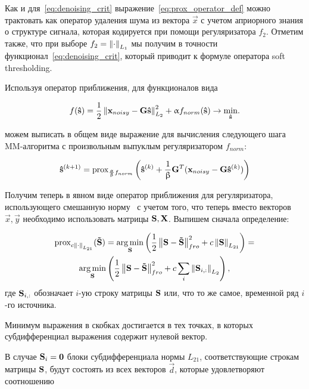 Как и для~\ref{eq:denoising_crit} выражение~\ref{eq:prox_operator_def} можно
трактовать как оператор удаления шума из вектора $\vec{x}$ с учетом априорного
знания о структуре сигнала, которая кодируется при помощи регуляризатора $f_2$.
Отметим также, что при выборе $f_2 = \left\lVert\cdot\right\rVert_{L_1}$ мы получим в точности
функционал~\ref{eq:denoising_crit}, который приводит к формуле оператора
soft thresholding.

Используя оператор приближения, для функционалов вида

\begin{equation}
    f(\mathbf{\hat{s}}) = \frac{1}{2}\left\lVert\mathbf{x}_{noisy} - \mathbf{G}\mathbf{\hat{s}}\right\rVert^2_{L_2} + \upalpha f_{norm}(\mathbf{\hat{s}})
    \rightarrow \underset{\mathbf{\hat{s}}}{\min}.
    \label{eq:abstract_reg_func_crit}
\end{equation}

можем выписать в общем виде выражение для вычисления следующего шага
MM-алгоритма с произвольным выпуклым регуляризатором $f_{norm}$:

\begin{equation}
    \mathbf{\hat{s}}^{(k+1)} =
    \operatorname{prox}_{\frac{\upalpha}{\upbeta} f_{norm}}\left(\mathbf{\hat{s}}^{(k)} + \frac{1}{\upbeta} \mathbf{G}^T(\mathbf{x}_{noisy} - \mathbf{G} \mathbf{\hat{s}}^{(k)})\right)
    \label{eq:mm_next_iter_prox}
\end{equation}

Получим теперь в явном виде оператор приближения для регуляризатора,
использующего смешанную норму~\cite{Gramfort2012} с учетом того, что теперь
вместо векторов $\vec{x}, \vec{y}$ необходимо использовать матрицы $\mathbf{S},
\mathbf{X}$. Выпишем сначала определение:

\begin{multline}
    \operatorname{prox}_{c \left\lVert\cdot\right\rVert_{L_{21}}}(\mathbf{\tilde{S}}) =
    \operatorname*{arg\,min}_{\mathbf{S}}\left(\frac{1}{2}\left\lVert\mathbf{S - \tilde{S}}\right\rVert^2_{fro} + c \left\lVert\mathbf{S}\right\rVert_{L_{21}}\right)=\\
    \operatorname*{arg\,min}_{\mathbf{S}}\left(\frac{1}{2}\left\lVert\mathbf{S - \tilde{S}}\right\rVert^2_{fro} + c \sum_i \left\lVert\mathbf{S}_{i,:}\right\rVert_{L_2}\right),
    \label{eq:def_proximity_for_l21}
\end{multline}
где $\mathbf{S}_{i,:}$ обозначает $i$-ую строку матрицы $\mathbf{S}$ или, что то же
самое, временной ряд $i$-го источника.

Минимум выражения в скобках достигается в тех точках, в которых субдифференциал
выражения содержит нулевой вектор.

В случае $\mathbf{S}_i = \mathbf{0}$ блоки субдифференциала нормы $L_{21}$,
соответствующие строкам матрицы $\mathbf{S}$,
будут состоять из всех
векторов $\vec{d}$, которые удовлетворяют соотношению


